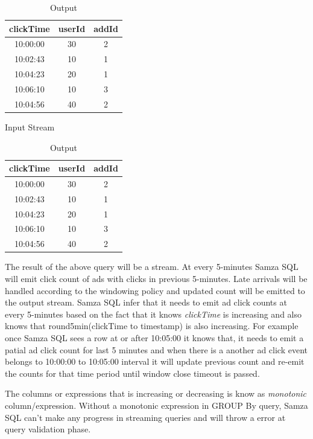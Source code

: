 \documentclass[10pt, conference, compsocconf]{IEEEtran}
\begin{document}
\begin{table}
\centering
\setlength\tabcolsep{4pt}
\begin{minipage}{0.2\textwidth}
\centering
\begin{tabular}{ |c|c|c| } 
\hline
clickTime & userId & addId \\
\hline
10:00:00  & 30 & 2 \\
10:02:43  & 10 & 1 \\
10:04:23  & 20 & 1 \\
10:06:10  & 10 & 3 \\ 
10:04:56  & 40 & 2 \\  
\hline
\end{tabular}
\caption{Input Stream}
\label{tab:input} 
\end{minipage}%
\hfill
\begin{minipage}{0.2\textwidth}
\centering
\begin{tabular}{ |c|c|c| } 
\hline
clickTime & userId & addId \\
\hline
10:00:00  & 30 & 2 \\
10:02:43  & 10 & 1 \\
10:04:23  & 20 & 1 \\
10:06:10  & 10 & 3 \\ 
10:04:56  & 40 & 2 \\ 
\hline
\end{tabular}
 \caption{Output} 
 \label{tab:output} 
\end{minipage}
\end{table}


 The result of the above query will be a stream. At every 5-minutes Samza SQL will emit click count of ads with clicks in previous 5-minutes. Late arrivals will be handled according to the windowing policy and updated count will be emitted to the output stream. Samza SQL infer that it needs to emit ad click counts at every 5-minutes based on the fact that it knows \textit{clickTime} is increasing  and also knows that round5min(clickTime to timestamp) is also increasing. For example once Samza SQL sees a row at or after 10:05:00 it knows that, it needs to emit a patial ad click count for last 5 minutes and when there is a another ad click event belongs to 10:00:00 to 10:05:00 interval it will update previous count and re-emit the counts for that time period until window close timeout is passed. 

The columns or expressions that is increasing or decreasing is know as \textit{monotonic} column/expression. Without a monotonic expression in GROUP By query, Samza SQL can't make any progress in streaming queries and will throw a error at query validation phase. 
\end{document}
